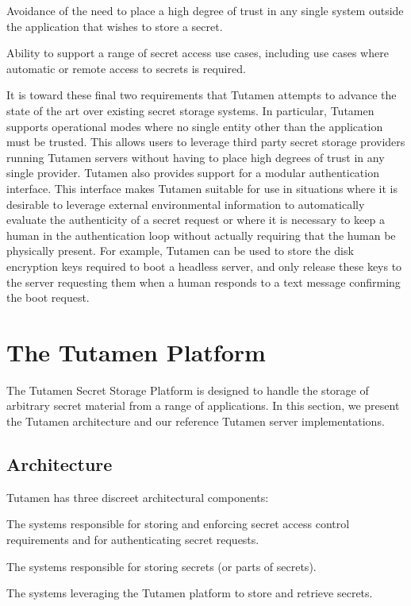 \begin{packed_item}
\item Avoidance of the need to place a high degree of trust in any
  single system outside the application that wishes to store a secret.
\item Ability to support a range of secret access use cases, including
  use cases where automatic or remote access to secrets is required.
\end{packed_item}

It is toward these final two requirements that Tutamen attempts to
advance the state of the art over existing secret storage systems. In
particular, Tutamen supports operational modes where no single entity
other than the application must be trusted. This allows users to
leverage third party secret storage providers running Tutamen servers
without having to place high degrees of trust in any single
provider. Tutamen also provides support for a modular authentication
interface. This interface makes Tutamen suitable for use in situations
where it is desirable to leverage external environmental information
to automatically evaluate the authenticity of a secret request or
where it is necessary to keep a human in the authentication loop
without actually requiring that the human be physically present. For
example, Tutamen can be used to store the disk encryption keys
required to boot a headless server, and only release these keys to the
server requesting them when a human responds to a text message
confirming the boot request.


\section{The Tutamen Platform}
\label{chap:tutamen:platform}

The Tutamen Secret Storage Platform is designed to handle the storage
of arbitrary secret material from a range of applications. In this
section, we present the Tutamen architecture and our reference Tutamen
server implementations.

\subsection{Architecture}
\label{chap:tutamen:platform:arch}

Tutamen has three discreet architectural components:

\begin{packed_desc}
\item[Access Control Servers (ACS):] The systems responsible for
  storing and enforcing secret access control requirements and for
  authenticating secret requests.
\item[Storage Servers (SS):] The systems responsible for storing
  secrets (or parts of secrets).
\item[Applications:] The systems leveraging the Tutamen platform to
  store and retrieve secrets.
\end{packed_desc}

